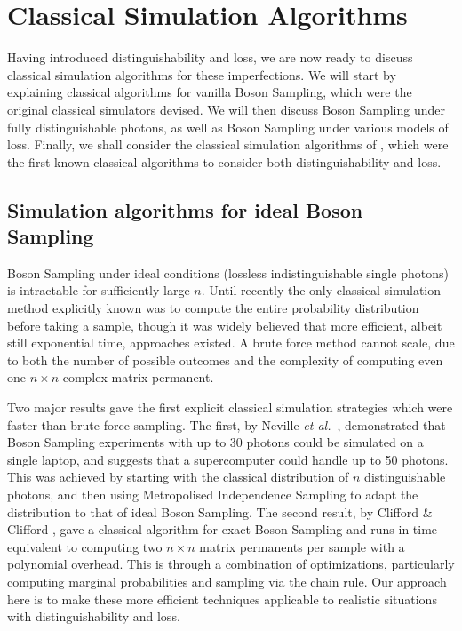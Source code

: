 \section{Classical Simulation Algorithms}
\label{sec:classical-simulations}

Having introduced distinguishability and loss, we are now ready to discuss classical simulation algorithms for these imperfections. We will start by explaining classical algorithms for vanilla Boson Sampling, which were the original classical simulators devised. We will then discuss Boson Sampling under fully distinguishable photons, as well as Boson Sampling under various models of loss. Finally, we shall consider the classical simulation algorithms of \cite{renema2018, renema2018loss}, which were the first known classical algorithms to consider both distinguishability and loss.

\subsection{Simulation algorithms for ideal Boson Sampling}

Boson Sampling under ideal conditions (lossless indistinguishable single photons) is intractable for sufficiently large $n$. 
Until recently the only classical simulation method explicitly known was to compute the entire probability distribution before taking a sample, though it was widely believed that more efficient, albeit still exponential time, approaches existed. 
A brute force method cannot scale, due to both the number of possible outcomes and the complexity of computing even one $n\times n$ complex matrix permanent.

Two major results gave the first explicit classical simulation strategies which were faster than brute-force sampling. 
The first, by Neville \textit{et al.}~\cite{neville2017}, demonstrated that Boson Sampling experiments with up to 30 photons could be simulated on a single laptop, and suggests that a supercomputer could handle up to 50 photons. 
This was achieved by starting with the classical distribution of $n$ distinguishable photons, and then using Metropolised Independence Sampling to adapt the distribution to that of ideal Boson Sampling.
The second result, by Clifford \& Clifford \cite{clifford2017}, gave a classical algorithm for exact Boson Sampling and runs in time equivalent to computing two $n \times n$ matrix  permanents per sample with a polynomial overhead. 
This is through a combination of optimizations, particularly computing marginal probabilities and sampling via the chain rule.
Our approach here is to make these more efficient techniques applicable to realistic situations with distinguishability and loss.

